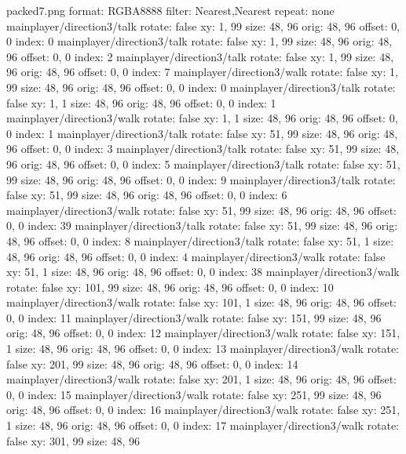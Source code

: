 packed7.png
format: RGBA8888
filter: Nearest,Nearest
repeat: none
mainplayer/direction3/talk
  rotate: false
  xy: 1, 99
  size: 48, 96
  orig: 48, 96
  offset: 0, 0
  index: 0
mainplayer/direction3/talk
  rotate: false
  xy: 1, 99
  size: 48, 96
  orig: 48, 96
  offset: 0, 0
  index: 2
mainplayer/direction3/talk
  rotate: false
  xy: 1, 99
  size: 48, 96
  orig: 48, 96
  offset: 0, 0
  index: 7
mainplayer/direction3/walk
  rotate: false
  xy: 1, 99
  size: 48, 96
  orig: 48, 96
  offset: 0, 0
  index: 0
mainplayer/direction3/talk
  rotate: false
  xy: 1, 1
  size: 48, 96
  orig: 48, 96
  offset: 0, 0
  index: 1
mainplayer/direction3/walk
  rotate: false
  xy: 1, 1
  size: 48, 96
  orig: 48, 96
  offset: 0, 0
  index: 1
mainplayer/direction3/talk
  rotate: false
  xy: 51, 99
  size: 48, 96
  orig: 48, 96
  offset: 0, 0
  index: 3
mainplayer/direction3/talk
  rotate: false
  xy: 51, 99
  size: 48, 96
  orig: 48, 96
  offset: 0, 0
  index: 5
mainplayer/direction3/talk
  rotate: false
  xy: 51, 99
  size: 48, 96
  orig: 48, 96
  offset: 0, 0
  index: 9
mainplayer/direction3/talk
  rotate: false
  xy: 51, 99
  size: 48, 96
  orig: 48, 96
  offset: 0, 0
  index: 6
mainplayer/direction3/walk
  rotate: false
  xy: 51, 99
  size: 48, 96
  orig: 48, 96
  offset: 0, 0
  index: 39
mainplayer/direction3/talk
  rotate: false
  xy: 51, 99
  size: 48, 96
  orig: 48, 96
  offset: 0, 0
  index: 8
mainplayer/direction3/talk
  rotate: false
  xy: 51, 1
  size: 48, 96
  orig: 48, 96
  offset: 0, 0
  index: 4
mainplayer/direction3/walk
  rotate: false
  xy: 51, 1
  size: 48, 96
  orig: 48, 96
  offset: 0, 0
  index: 38
mainplayer/direction3/walk
  rotate: false
  xy: 101, 99
  size: 48, 96
  orig: 48, 96
  offset: 0, 0
  index: 10
mainplayer/direction3/walk
  rotate: false
  xy: 101, 1
  size: 48, 96
  orig: 48, 96
  offset: 0, 0
  index: 11
mainplayer/direction3/walk
  rotate: false
  xy: 151, 99
  size: 48, 96
  orig: 48, 96
  offset: 0, 0
  index: 12
mainplayer/direction3/walk
  rotate: false
  xy: 151, 1
  size: 48, 96
  orig: 48, 96
  offset: 0, 0
  index: 13
mainplayer/direction3/walk
  rotate: false
  xy: 201, 99
  size: 48, 96
  orig: 48, 96
  offset: 0, 0
  index: 14
mainplayer/direction3/walk
  rotate: false
  xy: 201, 1
  size: 48, 96
  orig: 48, 96
  offset: 0, 0
  index: 15
mainplayer/direction3/walk
  rotate: false
  xy: 251, 99
  size: 48, 96
  orig: 48, 96
  offset: 0, 0
  index: 16
mainplayer/direction3/walk
  rotate: false
  xy: 251, 1
  size: 48, 96
  orig: 48, 96
  offset: 0, 0
  index: 17
mainplayer/direction3/walk
  rotate: false
  xy: 301, 99
  size: 48, 96
